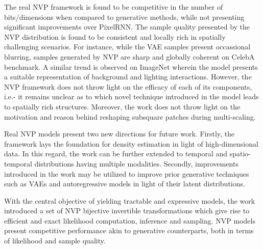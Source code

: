 \documentclass[11pt,letterpaper]{article}
\begin{document}
The real NVP framework is found to be competitive in the number of bits/dimensions when compared to generative methods, while not presenting significant improvements over PixelRNN. The sample quality presented by the NVP distribution is found to be consistent and locally rich in spatially challenging scenarios. For instance, while the VAE samples present occassional blurring, samples generated by NVP are sharp and globally coherent on CelebA benchmark. A similar trend is observed on ImageNet wherein the model presents a suitable representation of background and lighting interactions. However, the NVP framework does not throw light on the efficacy of each of its components, i.e.- it remains unclear as to which novel technique introduced in the model leads to spatially rich structures. Moreover, the work does not throw light on the motivation and reason behind reshaping subsquare patches during multi-scaling.

Real NVP models present two new directions for future work. Firstly, the framework lays the foundation for density estimation in light of high-dimensional data. In this regard, the work can be further extended to temporal and spatio-temporal distributions having multiple modalities. Secondly, improvements introduced in the work may be utilized to improve prior generative techniques such as VAEs and autoregressive models in light of their latent distributions. 

With the central objective of yielding tractable and expressive models, the work introduced a set of NVP bijective invertible transformations which give rise to efficient and exact likelihood computation, inference and sampling. NVP models present competitive performance akin to generative counterparts, both in terms of likelihood and sample quality.
\end{document}
